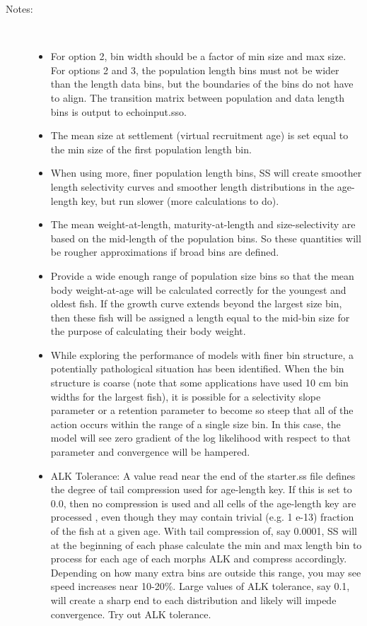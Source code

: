 \begin{description}
	\item[Notes:]\
	\begin{itemize}
		\item For option 2, bin width should be a factor of min size and max size.  For options 2 and 3, the population length bins must not be wider than the length data bins, but the boundaries of the bins do not have to align.  The transition matrix between population and data length bins is output to echoinput.sso.
		\item The mean size at settlement (virtual recruitment age) is set equal to the min size of the first population length bin.
		\item When using more, finer population length bins, SS will create smoother length selectivity curves and smoother length distributions in the age-length key, but run slower (more calculations to do).
		\item The mean weight-at-length, maturity-at-length and size-selectivity are based on the mid-length of the population bins.  So these quantities will be rougher approximations if broad bins are defined.
		\item Provide a wide enough range of population size bins so that the mean body weight-at-age will be calculated correctly for the youngest and oldest fish.  If the growth curve extends beyond the largest size bin, then these fish will be assigned a length equal to the mid-bin size for the purpose of calculating their body weight.
		\item While exploring the performance of models with finer bin structure, a potentially pathological situation has been identified.  When the bin structure is coarse (note that some applications have used 10 cm bin widths for the largest fish), it is possible for a selectivity slope parameter or a retention parameter to become so steep that all of the action occurs within the range of a single size bin.  In this case, the model will see zero gradient of the log likelihood with respect to that parameter and convergence will be hampered.
		\item ALK Tolerance:  A value read near the end of the starter.ss file defines the degree of tail compression used for age-length key.  If this is set to 0.0, then no compression is used and all cells of the age-length key are processed , even though they may contain trivial (e.g. 1 e-13) fraction of the fish at a given age.  With tail compression of, say 0.0001, SS will at the beginning of each phase calculate the min and max length bin to process for each age of each morphs ALK and compress accordingly.  Depending on how many extra bins are outside this range, you may see speed increases near 10-20\%.  Large values of ALK tolerance, say 0.1, will create a sharp end to each distribution and likely will impede convergence.  Try out ALK tolerance.
	\end{itemize}
\end{description}

